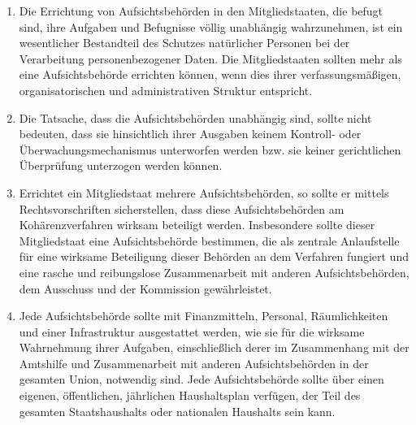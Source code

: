 \begin{enumerate}

   \item Die Errichtung von Aufsichtsbehörden in den Mitgliedstaaten, die befugt sind, ihre Aufgaben und Befugnisse
    völlig unabhängig wahrzunehmen, ist ein wesentlicher Bestandteil des Schutzes natürlicher Personen bei der
    Verarbeitung personenbezogener Daten. Die Mitgliedstaaten sollten mehr als eine Aufsichtsbehörde errichten können,
    wenn dies ihrer verfassungsmäßigen, organisatorischen und administrativen Struktur entspricht.%
   \label{itm:eg-117}
   

   \item Die Tatsache, dass die Aufsichtsbehörden unabhängig sind, sollte nicht bedeuten, dass sie hinsichtlich ihrer
    Ausgaben keinem Kontroll- oder Überwachungsmechanismus unterworfen werden bzw. sie keiner gerichtlichen Überprüfung
    unterzogen werden können.%
   \label{itm:eg-118}
   

   \item Errichtet ein Mitgliedstaat mehrere Aufsichtsbehörden, so sollte er mittels Rechtsvorschriften sicherstellen,
    dass diese Aufsichtsbehörden am Kohärenzverfahren wirksam beteiligt werden. Insbesondere sollte dieser
    Mitgliedstaat eine Aufsichtsbehörde bestimmen, die als zentrale Anlaufstelle für eine wirksame Beteiligung dieser
    Behörden an dem Verfahren fungiert und eine rasche und reibungslose Zusammenarbeit mit anderen Aufsichtsbehörden,
    dem Ausschuss und der Kommission gewährleistet.%
   \label{itm:eg-119}
   

   \item Jede Aufsichtsbehörde sollte mit Finanzmitteln, Personal, Räumlichkeiten und einer Infrastruktur ausgestattet
    werden, wie sie für die wirksame Wahrnehmung ihrer Aufgaben, einschließlich derer im Zusammenhang mit der Amtshilfe
    und Zusammenarbeit mit anderen Aufsichtsbehörden in der gesamten Union, notwendig sind. Jede Aufsichtsbehörde
    sollte über einen eigenen, öffentlichen, jährlichen Haushaltsplan verfügen, der Teil des gesamten Staatshaushalts
    oder nationalen Haushalts sein kann.%
   \label{itm:eg-120}
   


\end{enumerate}
